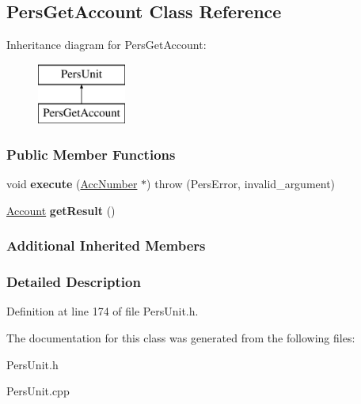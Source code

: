 \hypertarget{classPersGetAccount}{\subsection{Pers\-Get\-Account Class Reference}
\label{d1/d40/classPersGetAccount}
}
Inheritance diagram for Pers\-Get\-Account\-:\begin{figure}[H]
\begin{center}
\leavevmode
\includegraphics[height=2.000000cm]{d1/d40/classPersGetAccount}
\end{center}
\end{figure}
\subsubsection*{Public Member Functions}
\begin{DoxyCompactItemize}
\item 
\hypertarget{classPersGetAccount_aebcae427483ef6221ca67c07469d7182}{void {\bfseries execute} (\hyperlink{classAccNumber}{Acc\-Number} $\ast$)  throw (\-Pers\-Error, invalid\-\_\-argument)}\label{d1/d40/classPersGetAccount_aebcae427483ef6221ca67c07469d7182}

\item 
\hypertarget{classPersGetAccount_a83c9c2143910b7a99536e81eea5f907e}{\hyperlink{classAccount}{Account} {\bfseries get\-Result} ()}\label{d1/d40/classPersGetAccount_a83c9c2143910b7a99536e81eea5f907e}

\end{DoxyCompactItemize}
\subsubsection*{Additional Inherited Members}


\subsubsection{Detailed Description}


Definition at line 174 of file Pers\-Unit.\-h.



The documentation for this class was generated from the following files\-:\begin{DoxyCompactItemize}
\item 
Pers\-Unit.\-h\item 
Pers\-Unit.\-cpp\end{DoxyCompactItemize}
